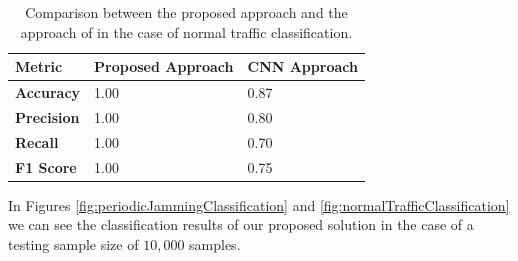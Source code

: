 \documentclass[futureinternet,article,submit,pdftex,moreauthors]{Definitions/mdpi}
\begin{document}
\begin{table}[H]
	\caption{Comparison between the proposed approach and the approach of \cite{JammingDetectionIoT-Hussain} in the case of normal traffic classification.}\label{tab:normal_traffic_comparison}
	\begin{tabularx}{\textwidth}{CCC}
	\toprule
	\textbf{Metric} & \textbf{Proposed Approach} & \textbf{CNN Approach} \\
	\midrule
	\textbf{Accuracy}  & 1.00 & 0.87 \\
	\textbf{Precision} & 1.00 & 0.80 \\
	\textbf{Recall}    & 1.00 & 0.70 \\
	\textbf{F1 Score}  & 1.00 & 0.75 \\
	\bottomrule
	\end{tabularx}
\end{table}

In Figures \ref{fig:periodicJammingClassification} and \ref{fig:normalTrafficClassification} we can see the classification results of our proposed solution in the case of a testing sample size of $10,000$ samples.
\end{document}
